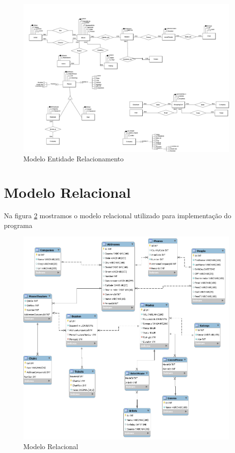 \documentclass[a4paper,10pt]{article}
\begin{document}
\begin{figure}
\includegraphics[width=\columnwidth]{UnBCineFlix_MER}%
\caption{Modelo Entidade Relacionamento}%
\label{fig:mer}%
\end{figure}

\section{Modelo Relacional}

Na figura \ref{fig:mr} mostramos o modelo relacional utilizado para implementação  do programa

\begin{figure}
\includegraphics[width=\columnwidth]{UnBCineFlix_MR}%
\caption{Modelo Relacional}%
\label{fig:mr}%
\end{figure}
\end{document}
